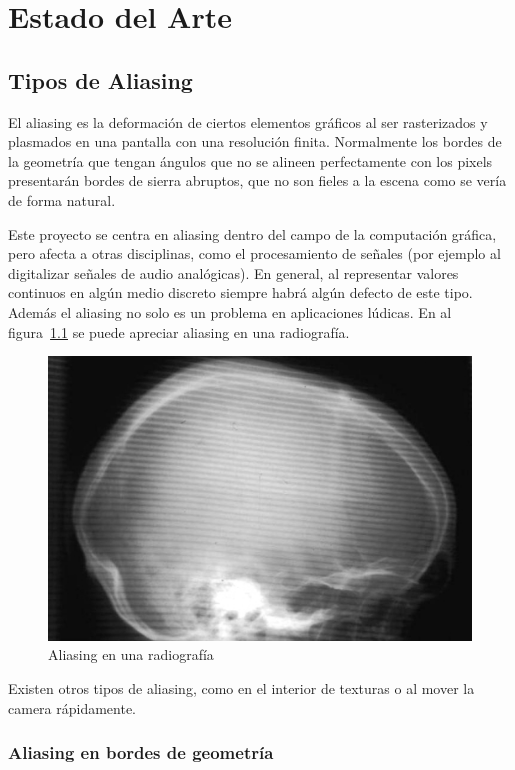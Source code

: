 \documentclass[withindex, glossary]{cam-thesis}
\begin{document}
\chapter{Estado del Arte}

\section{Tipos de Aliasing}

El aliasing es la deformación de ciertos elementos gráficos al ser rasterizados y plasmados en una pantalla con una resolución finita\cite{Mitchell:1988:RFC:378456.378514}. Normalmente los bordes de la geometría que tengan ángulos que no se alineen perfectamente con los pixels presentarán bordes de sierra abruptos, que no son fieles a la escena como se vería de forma natural.

Este proyecto se centra en aliasing dentro del campo de la computación gráfica, pero afecta a otras disciplinas, como el procesamiento de señales (por ejemplo al digitalizar señales de audio analógicas). En general, al representar valores continuos en algún medio discreto siempre habrá algún defecto de este tipo\cite{Mitchell:1988:RFC:378456.378514}. Además el aliasing no solo es un problema en aplicaciones lúdicas. En al figura~\ref{skull} se puede apreciar aliasing en una radiografía.

\begin{figure}[!htbp]
    \includegraphics[width=.7\linewidth]{figures/skull.jpg}
    \caption{Aliasing en una radiografía\cite{rayos}}
    \label{skull}
\end{figure}

Existen otros tipos de aliasing, como en el interior de texturas o al mover la camera rápidamente.

\subsection{Aliasing en bordes de geometría}
\end{document}
